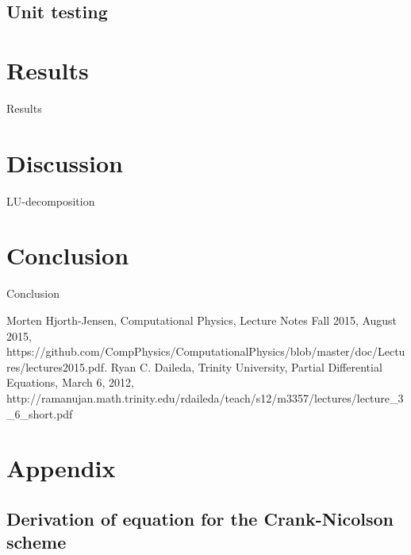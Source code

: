 \documentclass[reprint, english,notitlepage,nofootinbib]{revtex4-1}  %
\begin{document}
\subsection{Unit testing}


\section{Results}

Results

\section{Discussion}

LU-decomposition

\section{Conclusion}

Conclusion


\onecolumngrid
\vspace{1cm} %

\begin{thebibliography}{}
 Morten Hjorth-Jensen, Computational Physics, Lecture Notes Fall 2015, August 2015, https://github.com/CompPhysics/ComputationalPhysics/blob/master/doc/Lectures/lectures2015.pdf.
 Ryan C. Daileda, Trinity University, Partial Differential Equations, March 6, 2012, http://ramanujan.math.trinity.edu/rdaileda/teach/s12/m3357/lectures/lecture\_3\_6\_short.pdf

\end{thebibliography}


\section{Appendix}

\subsection{Derivation of equation for the Crank-Nicolson scheme} \label{sect:Crank-Nicolson_derivation}
\end{document}
